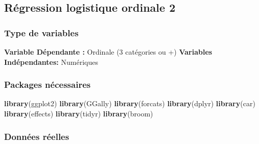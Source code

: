 \documentclass[
]{book}
\newenvironment{Shaded}{\begin{snugshade}}{\end{snugshade}}
\newcommand{\KeywordTok}[1]{\textcolor[rgb]{0.13,0.29,0.53}{\textbf{#1}}}
\newcommand{\NormalTok}[1]{#1}
\begin{document}
\hypertarget{ruxe9gression-logistique-ordinale-2}{%
\subsection{Régression logistique ordinale 2}\label{ruxe9gression-logistique-ordinale-2}}

\hypertarget{type-de-variables-18}{%
\subsubsection{Type de variables}\label{type-de-variables-18}}

\textbf{Variable Dépendante :} Ordinale (3 catégories ou +)
\textbf{Variables Indépendantes:} Numériques

\hypertarget{packages-nuxe9cessaires-18}{%
\subsubsection{Packages nécessaires}\label{packages-nuxe9cessaires-18}}

\begin{Shaded}
\begin{Highlighting}[]
\KeywordTok{library}\NormalTok{(ggplot2)}
\KeywordTok{library}\NormalTok{(GGally)}
\KeywordTok{library}\NormalTok{(forcats)}
\KeywordTok{library}\NormalTok{(dplyr)}
\KeywordTok{library}\NormalTok{(car)}
\KeywordTok{library}\NormalTok{(effects)}
\KeywordTok{library}\NormalTok{(tidyr)}
\KeywordTok{library}\NormalTok{(broom)}
\end{Highlighting}
\end{Shaded}

\hypertarget{donnuxe9es-ruxe9elles-18}{%
\subsubsection{Données réelles}\label{donnuxe9es-ruxe9elles-18}}
\end{document}
